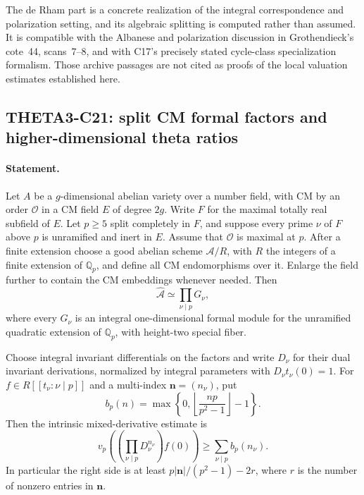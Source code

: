 \documentclass[11pt]{article}
\newcommand{\Q}{\mathbb Q}\newcommand{\C}{\mathbb C}\newcommand{\Z}{\mathbb Z}\newcommand{\R}{\mathbb R}\newcommand{\A}{\mathbb A}\newcommand{\OO}{\mathcal O}
\theoremstyle{definition}\newtheorem{definition}[theorem]{Definition}\newtheorem{remark}[theorem]{Remark}
\begin{document}
The de Rham part is a concrete realization of the integral
correspondence and polarization setting, and its algebraic
splitting is computed rather than assumed.  It is compatible
with the Albanese and polarization discussion in Grothendieck's
cote~44, scans~7--8, and with C17's precisely stated cycle-class
specialization formalism.  Those archive passages are not cited
as proofs of the local valuation estimates established here.


\subsection{THETA3-C21: split CM formal factors and higher-dimensional theta ratios}\label{C21}

\paragraph{Statement.}
Let $A$ be a $g$-dimensional abelian variety over a number field,
with CM by an order $\mathcal O$ in a CM field $E$ of degree
$2g$.  Write $F$ for the maximal totally real subfield of $E$.
Let $p\geq5$ split completely in $F$, and suppose every prime
$\nu$ of $F$ above $p$ is unramified and inert in $E$.
Assume that $\mathcal O$ is maximal at $p$.
After a finite extension choose a good abelian scheme
$\mathcal A/R$, with $R$ the integers of a finite extension
of $\Q_p$, and define all CM endomorphisms over it.
Enlarge the field further to contain the CM embeddings whenever
needed.  Then
\begin{equation}\label{C21-formal-product}
 \widehat{\mathcal A}\simeq
       \prod_{\nu\mid p}G_\nu,
\end{equation}
where every $G_\nu$ is an integral one-dimensional formal
module for the unramified quadratic extension of $\Q_p$,
with height-two special fiber.

Choose integral invariant differentials on the factors and
write $D_\nu$ for their dual invariant derivations, normalized
by integral parameters with $D_\nu t_\nu(0)=1$.
For $f\in R[[t_\nu:\nu\mid p]]$ and a multi-index
$\mathbf n=(n_\nu)$, put
\[
 b_p(n)=\max\left\{0,
            \left\lfloor\frac{np}{p^2-1}\right\rfloor-1\right\}.
\]
Then the intrinsic mixed-derivative estimate is
\begin{equation}\label{C21-mixed-bound}
 v_p\left(\left(\prod_{\nu\mid p}D_\nu^{n_\nu}\right)f(0)\right)
       \geq\sum_{\nu\mid p}b_p(n_\nu).
\end{equation}
In particular the right side is at least
$p|\mathbf n|/(p^2-1)-2r$, where $r$ is the number of
nonzero entries in $\mathbf n$.
\end{document}
